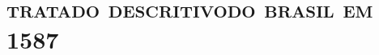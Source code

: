 
\part[tratado descritivo do brasil em 1587]{\textsc{tratado descritivo\break do brasil em 1587}} 


%
